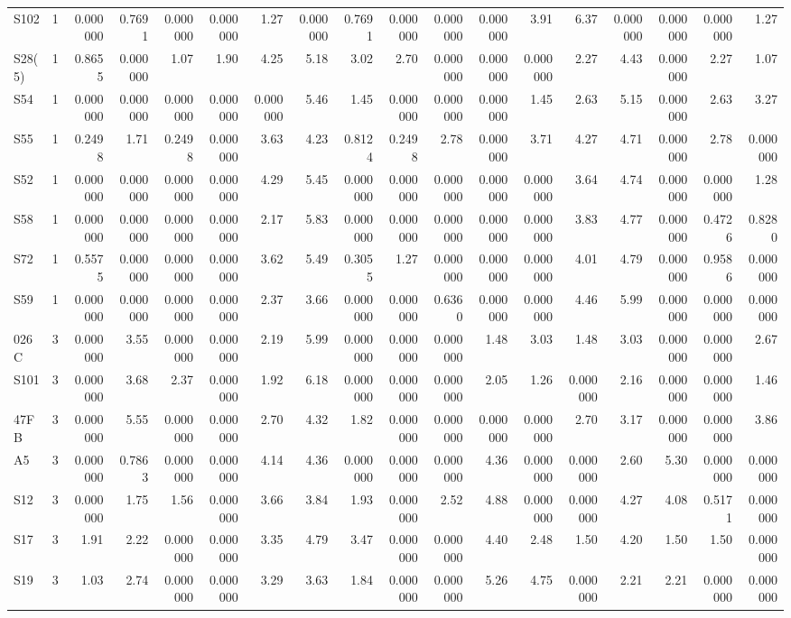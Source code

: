 {\begin{longtable}{lrrrrrrrrrrrrrrrrr}
  S102 & 1 & 0.000000 & 0.7691 & 0.000000 & 0.000000 & 1.27 & 0.000000 & 0.7691 & 0.000000 & 0.000000 & 0.000000 & 3.91 & 6.37 & 0.000000 & 0.000000 & 0.000000 & 1.27 \\
  S28(5) & 1 & 0.8655 & 0.000000 & 1.07 & 1.90 & 4.25 & 5.18 & 3.02 & 2.70 & 0.000000 & 0.000000 & 0.000000 & 2.27 & 4.43 & 0.000000 & 2.27 & 1.07 \\
  S54 & 1 & 0.000000 & 0.000000 & 0.000000 & 0.000000 & 0.000000 & 5.46 & 1.45 & 0.000000 & 0.000000 & 0.000000 & 1.45 & 2.63 & 5.15 & 0.000000 & 2.63 & 3.27 \\
  S55 & 1 & 0.2498 & 1.71 & 0.2498 & 0.000000 & 3.63 & 4.23 & 0.8124 & 0.2498 & 2.78 & 0.000000 & 3.71 & 4.27 & 4.71 & 0.000000 & 2.78 & 0.000000 \\
  S52 & 1 & 0.000000 & 0.000000 & 0.000000 & 0.000000 & 4.29 & 5.45 & 0.000000 & 0.000000 & 0.000000 & 0.000000 & 0.000000 & 3.64 & 4.74 & 0.000000 & 0.000000 & 1.28 \\
  S58 & 1 & 0.000000 & 0.000000 & 0.000000 & 0.000000 & 2.17 & 5.83 & 0.000000 & 0.000000 & 0.000000 & 0.000000 & 0.000000 & 3.83 & 4.77 & 0.000000 & 0.4726 & 0.8280 \\
  S72 & 1 & 0.5575 & 0.000000 & 0.000000 & 0.000000 & 3.62 & 5.49 & 0.3055 & 1.27 & 0.000000 & 0.000000 & 0.000000 & 4.01 & 4.79 & 0.000000 & 0.9586 & 0.000000 \\
  S59 & 1 & 0.000000 & 0.000000 & 0.000000 & 0.000000 & 2.37 & 3.66 & 0.000000 & 0.000000 & 0.6360 & 0.000000 & 0.000000 & 4.46 & 5.99 & 0.000000 & 0.000000 & 0.000000 \\
  026C & 3 & 0.000000 & 3.55 & 0.000000 & 0.000000 & 2.19 & 5.99 & 0.000000 & 0.000000 & 0.000000 & 1.48 & 3.03 & 1.48 & 3.03 & 0.000000 & 0.000000 & 2.67 \\
  S101 & 3 & 0.000000 & 3.68 & 2.37 & 0.000000 & 1.92 & 6.18 & 0.000000 & 0.000000 & 0.000000 & 2.05 & 1.26 & 0.000000 & 2.16 & 0.000000 & 0.000000 & 1.46 \\
  47FB & 3 & 0.000000 & 5.55 & 0.000000 & 0.000000 & 2.70 & 4.32 & 1.82 & 0.000000 & 0.000000 & 0.000000 & 0.000000 & 2.70 & 3.17 & 0.000000 & 0.000000 & 3.86 \\
  A5 & 3 & 0.000000 & 0.7863 & 0.000000 & 0.000000 & 4.14 & 4.36 & 0.000000 & 0.000000 & 0.000000 & 4.36 & 0.000000 & 0.000000 & 2.60 & 5.30 & 0.000000 & 0.000000 \\
  S12 & 3 & 0.000000 & 1.75 & 1.56 & 0.000000 & 3.66 & 3.84 & 1.93 & 0.000000 & 2.52 & 4.88 & 0.000000 & 0.000000 & 4.27 & 4.08 & 0.5171 & 0.000000 \\
  S17 & 3 & 1.91 & 2.22 & 0.000000 & 0.000000 & 3.35 & 4.79 & 3.47 & 0.000000 & 0.000000 & 4.40 & 2.48 & 1.50 & 4.20 & 1.50 & 1.50 & 0.000000 \\
  S19 & 3 & 1.03 & 2.74 & 0.000000 & 0.000000 & 3.29 & 3.63 & 1.84 & 0.000000 & 0.000000 & 5.26 & 4.75 & 0.000000 & 2.21 & 2.21 & 0.000000 & 0.000000 \\
\end{longtable}
}
